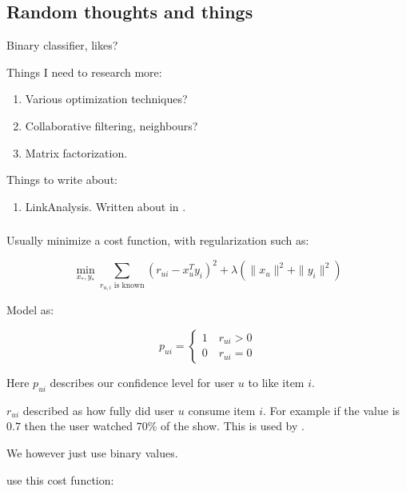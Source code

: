 
\subsection{Random thoughts and things}

Binary classifier, likes?

Things I need to research more:

\begin{enumerate}
    \item Various optimization techniques?
    \item Collaborative filtering, neighbours? \cite{hu2008collaborative}
    \item Matrix factorization.
\end{enumerate}

Things to write about:

\begin{enumerate}
    \item LinkAnalysis. Written about in \cite{huang2007comparison}.
\end{enumerate}


\subsubsection{\cite{hu2008collaborative}}

Usually minimize a cost function, with regularization such as:

\begin{equation}
    \min_{x_*, y_*} \sum_{r_{u,i} \text{ is known} } (r_{ui} - x_{u}^T y_i)^2 + \lambda(\|x_u\|^2 + \|y_i\|^2)
\end{equation}

Model as:

\begin{equation}
    p_{ui} = \begin{cases}
        1 \quad r_{ui} > 0 \\
        0 \quad r_{ui} = 0
    \end{cases}
\end{equation}

Here $p_{ui}$ describes our confidence level for user $u$ to like item $i$.

$r_{ui}$ described as how fully did user $u$ consume item $i$. For example if the value is $0.7$ then the user watched $70\%$ of the show. This is used by \cite{hu2008collaborative}.

We however just use binary values.

\cite{hu2008collaborative} use this cost function:

